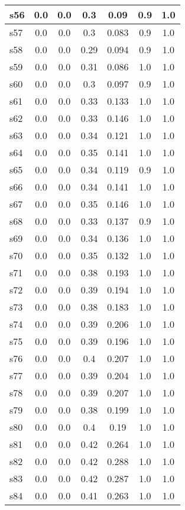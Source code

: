 \documentclass{article}
\begin{document}
\begin{tabular}{|l|c|c|c|c|c|c|}
\hline
s56 &0.0 & 0.0 & 0.3 & 0.09 & 0.9 & 1.0\\
\hline
s57 &0.0 & 0.0 & 0.3 & 0.083 & 0.9 & 1.0\\
\hline
s58 &0.0 & 0.0 & 0.29 & 0.094 & 0.9 & 1.0\\
\hline
s59 &0.0 & 0.0 & 0.31 & 0.086 & 1.0 & 1.0\\
\hline
s60 &0.0 & 0.0 & 0.3 & 0.097 & 0.9 & 1.0\\
\hline
s61 &0.0 & 0.0 & 0.33 & 0.133 & 1.0 & 1.0\\
\hline
s62 &0.0 & 0.0 & 0.33 & 0.146 & 1.0 & 1.0\\
\hline
s63 &0.0 & 0.0 & 0.34 & 0.121 & 1.0 & 1.0\\
\hline
s64 &0.0 & 0.0 & 0.35 & 0.141 & 1.0 & 1.0\\
\hline
s65 &0.0 & 0.0 & 0.34 & 0.119 & 0.9 & 1.0\\
\hline
s66 &0.0 & 0.0 & 0.34 & 0.141 & 1.0 & 1.0\\
\hline
s67 &0.0 & 0.0 & 0.35 & 0.146 & 1.0 & 1.0\\
\hline
s68 &0.0 & 0.0 & 0.33 & 0.137 & 0.9 & 1.0\\
\hline
s69 &0.0 & 0.0 & 0.34 & 0.136 & 1.0 & 1.0\\
\hline
s70 &0.0 & 0.0 & 0.35 & 0.132 & 1.0 & 1.0\\
\hline
s71 &0.0 & 0.0 & 0.38 & 0.193 & 1.0 & 1.0\\
\hline
s72 &0.0 & 0.0 & 0.39 & 0.194 & 1.0 & 1.0\\
\hline
s73 &0.0 & 0.0 & 0.38 & 0.183 & 1.0 & 1.0\\
\hline
s74 &0.0 & 0.0 & 0.39 & 0.206 & 1.0 & 1.0\\
\hline
s75 &0.0 & 0.0 & 0.39 & 0.196 & 1.0 & 1.0\\
\hline
s76 &0.0 & 0.0 & 0.4 & 0.207 & 1.0 & 1.0\\
\hline
s77 &0.0 & 0.0 & 0.39 & 0.204 & 1.0 & 1.0\\
\hline
s78 &0.0 & 0.0 & 0.39 & 0.207 & 1.0 & 1.0\\
\hline
s79 &0.0 & 0.0 & 0.38 & 0.199 & 1.0 & 1.0\\
\hline
s80 &0.0 & 0.0 & 0.4 & 0.19 & 1.0 & 1.0\\
\hline
s81 &0.0 & 0.0 & 0.42 & 0.264 & 1.0 & 1.0\\
\hline
s82 &0.0 & 0.0 & 0.42 & 0.288 & 1.0 & 1.0\\
\hline
s83 &0.0 & 0.0 & 0.42 & 0.287 & 1.0 & 1.0\\
\hline
s84 &0.0 & 0.0 & 0.41 & 0.263 & 1.0 & 1.0\\

\end{tabular}
\end{document}
